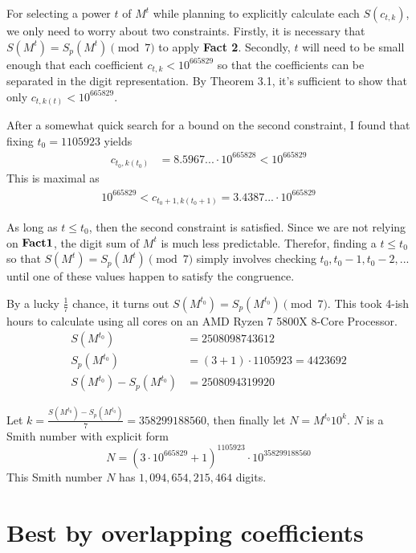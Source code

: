 \documentclass{amsart}
\newcommand{\ME}{{665829}}
\numberwithin{equation}{section}
\theoremstyle{plain} %
\theoremstyle{definition}
\theoremstyle{remark}
\begin{document}
For selecting a power $t$ of $M^t$ while planning to explicitly calculate each $S(c_{t,k})$, we only need to worry about two constraints. Firstly, it is necessary that $S(M^t) = S_p(M^t) \pmod{7}$ to apply {\bf Fact 2}. Secondly, $t$ will need to be small enough that each coefficient $c_{t,k} < 10^\ME$ so that the coefficients can be separated in the digit representation. By Theorem 3.1, it's sufficient to show that only $c_{t,k(t)} < 10^\ME$.

After a somewhat quick search for a bound on the second constraint, I found that fixing $t_0 = 1105923$ yields
\begin{align*}
c_{t_0,k(t_0)} &=          8.5967... \cdot 10 ^{665828}  < 10^{665829}
\end{align*}
This is maximal as 
\begin{align*}
10^{665829} < c_{t_0+1,k(t_0 + 1)}  =    3.4387... \cdot 10 ^{665829}
\end{align*}

As long as $t \leq t_0$, then the second constraint is satisfied. Since we are not relying on ${\bf Fact 1}$, the digit sum of $M^t$ is much less predictable. Therefor, finding a $t \leq t_0$ so that $S(M^t) = S_p(M^t) \pmod{7}$ simply involves checking $t_0, t_0 -1 , t_0 -2,...$ until one of these values happen to satisfy the congruence.

By a lucky $\frac{1}{7}$ chance, it turns out $S(M^{t_0}) =  S_p(M^{t_0}) \pmod{7}$. This took 4-ish hours to calculate using all cores on an AMD Ryzen 7 5800X 8-Core Processor.
\begin{align*}
S(M^{t_0})&=  2508098743612       \\
S_p(M^{t_0}) &= (3+ 1) \cdot  1105923 =  4423692   \\
S(M^{t_0}) -  S_p(M^{t_0}) &= 2508094319920
\end{align*}

Let $k = \frac{S(M^{t_0}) -  S_p(M^{t_0}) }{7} = 358299188560$, then finally let $N = M^{t_0} 10^k$. $N$ is a Smith number with explicit form
$$N = (3\cdot 10^\ME + 1)^{1105923} \cdot 10^{358299188560}$$
This Smith number $N$ has $1,094,654,215,464$ digits.
\,\\ \section{Best by overlapping coefficients}

\end{document}
